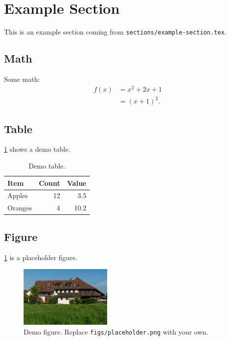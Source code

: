 \section{Example Section}
\label{sec:example-section}

This is an example section coming from \texttt{sections/example-section.tex}.

\subsection{Math}
Some math:
\begin{align}
f(x) &= x^2 + 2x + 1 \\
     &= (x + 1)^2.
\end{align}

\subsection{Table}
\cref{tab:demo} shows a demo table.

\begin{table}[H]
  \centering
  \begin{tabular}{lrr}
    \toprule
    Item & Count & Value \\
    \midrule
    Apples  & 12 & \num{3.5} \\
    Oranges &  4 & \num{10.2} \\
    \bottomrule
  \end{tabular}
  \caption{Demo table.}
  \label{tab:demo}
\end{table}

\subsection{Figure}
\cref{fig:demo} is a placeholder figure.

\begin{figure}[H]
  \centering
  \includegraphics[width=0.4\textwidth]{figs/placeholder.png}
  \caption{Demo figure. Replace \texttt{figs/placeholder.png} with your own.}
  \label{fig:demo}
\end{figure}
